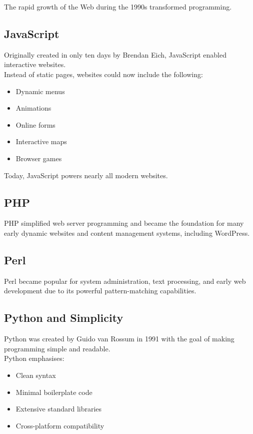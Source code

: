 The rapid growth of the Web during the 1990s transformed programming.

\subsection{JavaScript}

Originally created in only ten days by Brendan Eich, JavaScript enabled interactive websites. \\

Instead of static pages, websites could now include the following:

\begin{itemize}
    \item Dynamic menus
    \item Animations
    \item Online forms
    \item Interactive maps
    \item Browser games
\end{itemize}

Today, JavaScript powers nearly all modern websites.

\subsection{PHP}

PHP simplified web server programming and became the foundation for many early dynamic websites and content management systems, including WordPress.

\subsection{Perl}

Perl became popular for system administration, text processing, and early web development due to its powerful pattern-matching capabilities.

\subsection{Python and Simplicity}

Python was created by Guido van Rossum in 1991 with the goal of making programming simple and readable.\\

Python emphasises:

\begin{itemize}
    \item Clean syntax
    \item Minimal boilerplate code
    \item Extensive standard libraries
    \item Cross-platform compatibility
\end{itemize}

